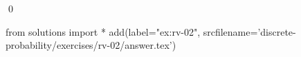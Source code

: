 
\begin{ex} 
  \label{ex:rv-02}
  
  \qed
\end{ex} 
\begin{python0}
from solutions import *
add(label="ex:rv-02",
    srcfilename='discrete-probability/exercises/rv-02/answer.tex') 
\end{python0}
